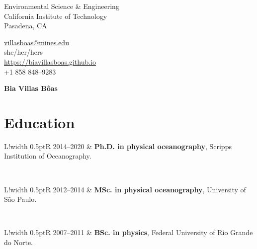 \documentclass[10pt]{article}
\newcommand\VRule{\color{lightgray}\vrule width 0.5pt}
\begin{document}
\pagestyle{empty}
\begin{minipage}[ht]{0.48\textwidth}
\begin{flushleft}
\small{Environmental Science \& Engineering}\\
\small{California Institute of Technology}\\
\small{Pasadena, CA} \\
\end{flushleft}
\end{minipage}
\hfill
\begin{minipage}[ht]{0.35\textwidth}
\begin{flushleft}
\noindent \href{mailto:villasboas@mines.edu}{villasboas@mines.edu}  \\
she/her/hers  \\
{\url{https://biavillasboas.github.io} } \\
\small{+1 858 848--9283}  \\
\end{flushleft}
\end{minipage}


\vspace{.5cm}
\begin{center}
	{\bfseries\Huge Bia Villas B\^{o}as}
\end{center}
\vspace{.5cm}

\section*{Education}
\vspace{.3cm}
\begin{tabular}{L!{\VRule}R}
\textsc{2014--2020} & \textbf{Ph.D. in physical oceanography}, Scripps Institution of Oceanography. \\ 
\end{tabular}
\\[10pt]
\begin{tabular}{L!{\VRule}R}
	\textsc{2012--2014} & \textbf{MSc. in physical oceanography}, University of S\~{a}o Paulo. \\ 
\end{tabular}
\\[10pt]
\begin{tabular}{L!{\VRule}R}
\textsc{2007--2011} & \textbf{BSc. in physics}, Federal University of Rio Grande do Norte. \\
\end{tabular}

\end{document}
